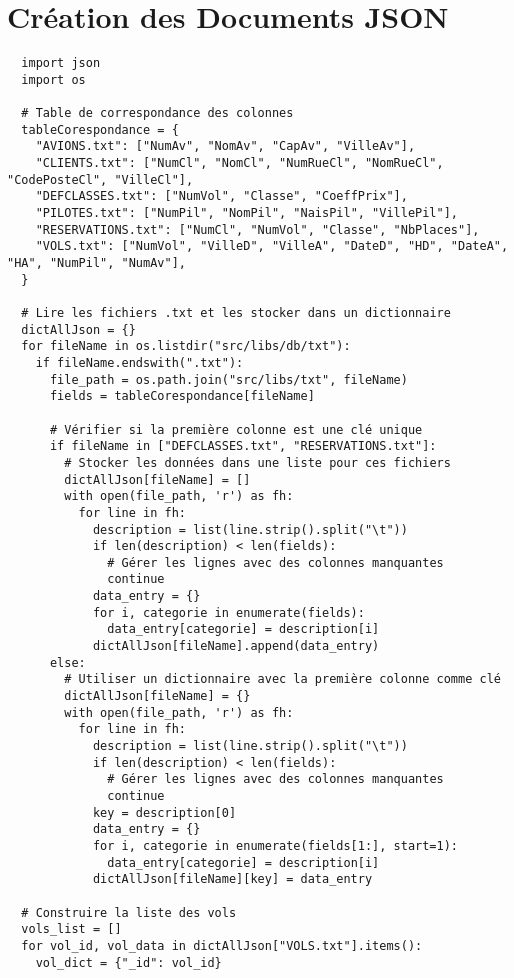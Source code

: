 \section{Création des Documents JSON}
\label{ann:code_json}
\begin{verbatim}
  import json
  import os
  
  # Table de correspondance des colonnes
  tableCorespondance = {
    "AVIONS.txt": ["NumAv", "NomAv", "CapAv", "VilleAv"],
    "CLIENTS.txt": ["NumCl", "NomCl", "NumRueCl", "NomRueCl", "CodePosteCl", "VilleCl"],
    "DEFCLASSES.txt": ["NumVol", "Classe", "CoeffPrix"],
    "PILOTES.txt": ["NumPil", "NomPil", "NaisPil", "VillePil"],
    "RESERVATIONS.txt": ["NumCl", "NumVol", "Classe", "NbPlaces"],
    "VOLS.txt": ["NumVol", "VilleD", "VilleA", "DateD", "HD", "DateA", "HA", "NumPil", "NumAv"],
  }
  
  # Lire les fichiers .txt et les stocker dans un dictionnaire
  dictAllJson = {}
  for fileName in os.listdir("src/libs/db/txt"):
    if fileName.endswith(".txt"):
      file_path = os.path.join("src/libs/txt", fileName)
      fields = tableCorespondance[fileName]
  
      # Vérifier si la première colonne est une clé unique
      if fileName in ["DEFCLASSES.txt", "RESERVATIONS.txt"]:
        # Stocker les données dans une liste pour ces fichiers
        dictAllJson[fileName] = []
        with open(file_path, 'r') as fh:
          for line in fh:
            description = list(line.strip().split("\t"))
            if len(description) < len(fields):
              # Gérer les lignes avec des colonnes manquantes
              continue
            data_entry = {}
            for i, categorie in enumerate(fields):
              data_entry[categorie] = description[i]
            dictAllJson[fileName].append(data_entry)
      else:
        # Utiliser un dictionnaire avec la première colonne comme clé
        dictAllJson[fileName] = {}
        with open(file_path, 'r') as fh:
          for line in fh:
            description = list(line.strip().split("\t"))
            if len(description) < len(fields):
              # Gérer les lignes avec des colonnes manquantes
              continue
            key = description[0]
            data_entry = {}
            for i, categorie in enumerate(fields[1:], start=1):
              data_entry[categorie] = description[i]
            dictAllJson[fileName][key] = data_entry
  
  # Construire la liste des vols
  vols_list = []
  for vol_id, vol_data in dictAllJson["VOLS.txt"].items():
    vol_dict = {"_id": vol_id}
  

\end{verbatim}
